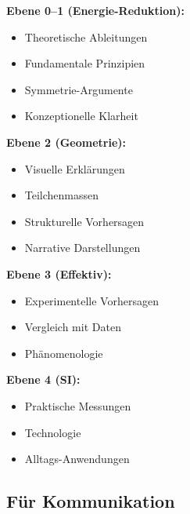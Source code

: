 \begin{important}
\textbf{Ebene 0--1 (Energie-Reduktion):}
\begin{itemize}
\item Theoretische Ableitungen
\item Fundamentale Prinzipien
\item Symmetrie-Argumente
\item Konzeptionelle Klarheit
\end{itemize}

\textbf{Ebene 2 (Geometrie):}
\begin{itemize}
\item Visuelle Erklärungen
\item Teilchenmassen
\item Strukturelle Vorhersagen
\item Narrative Darstellungen
\end{itemize}

\textbf{Ebene 3 (Effektiv):}
\begin{itemize}
\item Experimentelle Vorhersagen
\item Vergleich mit Daten
\item Phänomenologie
\end{itemize}

\textbf{Ebene 4 (SI):}
\begin{itemize}
\item Praktische Messungen
\item Technologie
\item Alltags-Anwendungen
\end{itemize}
\end{important}

\subsection{Für Kommunikation}

\begin{table}[h]
\centering
{}
\caption{Ebenen-Wahl nach Zielgruppe}
\end{table}

